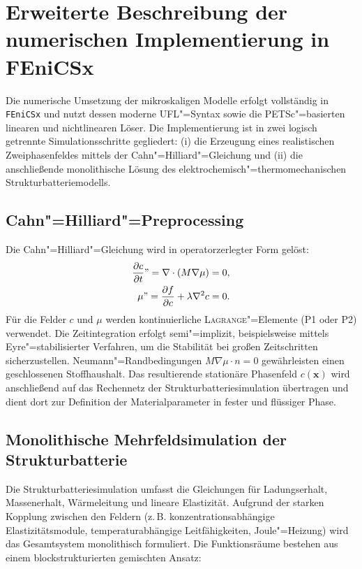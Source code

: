 \chapter{Erweiterte Beschreibung der numerischen Implementierung in FEniCSx}
\label{app:fem_implementation}

Die numerische Umsetzung der mikroskaligen Modelle erfolgt vollständig in \texttt{FEniCSx} und nutzt dessen moderne UFL"=Syntax sowie die PETSc"=basierten linearen und nichtlinearen Löser. Die Implementierung ist in zwei logisch getrennte Simulationsschritte gegliedert: (i) die Erzeugung eines realistischen Zweiphasenfeldes mittels der Cahn"=Hilliard"=Gleichung und (ii) die anschließende monolithische Lösung des elektrochemisch"=thermomechanischen Strukturbatteriemodells.

\section{Cahn"=Hilliard"=Preprocessing}

Die Cahn"=Hilliard"=Gleichung wird in operatorzerlegter Form gelöst:
\begin{align}
    \frac{\partial c}{\partial t} "= \nabla \cdot (M \nabla \mu) &= 0,\\
    \mu "= \frac{\partial f}{\partial c} + \lambda \nabla^2 c &= 0.
\end{align}
Für die Felder $c$ und $\mu$ werden kontinuierliche \textsc{Lagrange}"=Elemente (P1 oder P2) verwendet. Die Zeitintegration erfolgt semi"=implizit, beispielsweise mittels Eyre"=stabilisierter Verfahren, um die Stabilität bei großen Zeitschritten sicherzustellen. Neumann"=Randbedingungen $M \nabla \mu \cdot n = 0$ gewährleisten einen geschlossenen Stoffhaushalt. Das resultierende stationäre Phasenfeld $c(\boldsymbol{x})$ wird anschließend auf das Rechennetz der Strukturbatteriesimulation übertragen und dient dort zur Definition der Materialparameter in fester und flüssiger Phase.

\section{Monolithische Mehrfeldsimulation der Strukturbatterie}

Die Strukturbatteriesimulation umfasst die Gleichungen für Ladungserhalt, Massenerhalt, Wärmeleitung und lineare Elastizität. Aufgrund der starken Kopplung zwischen den Feldern (z.\,B. konzentrationsabhängige Elastizitätsmodule, temperaturabhängige Leitfähigkeiten, Joule"=Heizung) wird das Gesamtsystem monolithisch formuliert. Die Funktionsräume bestehen aus einem blockstrukturierten gemischten Ansatz:


